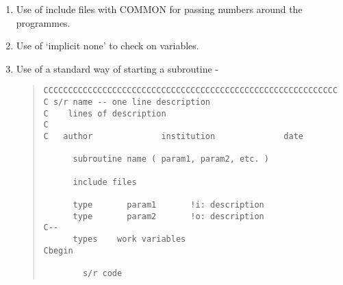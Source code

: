 \begin{enumerate}

\item Use of include files with COMMON for passing numbers around
      the programmes.
\item Use of `implicit none' to check on variables.
\item Use of a standard way of starting a subroutine -

\begin{quote}
\begin{tabbing}
\verb#CCCCCCCCCCCCCCCCCCCCCCCCCCCCCCCCCCCCCCCCCCCCCCCCCCCCCCCCCCCC # \\
\verb#C s/r name -- one line description                           # \\
\verb#C    lines of description                                    # \\
\verb#C                                                            # \\
\verb#C   author              institution              date        # \\
\verb#                                                             # \\
\verb#      subroutine name ( param1, param2, etc. )               # \\
\verb#                                                             # \\
\verb#      include files                                          # \\
\verb#                                                             # \\
\verb#      type       param1       !i: description                # \\
\verb#      type       param2       !o: description                # \\
\verb#C--                                                          # \\
\verb#      types    work variables                                # \\
\verb#Cbegin                                                       # \\
\verb#                                                             # \\
\verb#        s/r code                                             # \\
\end{tabbing}
\end{quote}


\end{enumerate}
